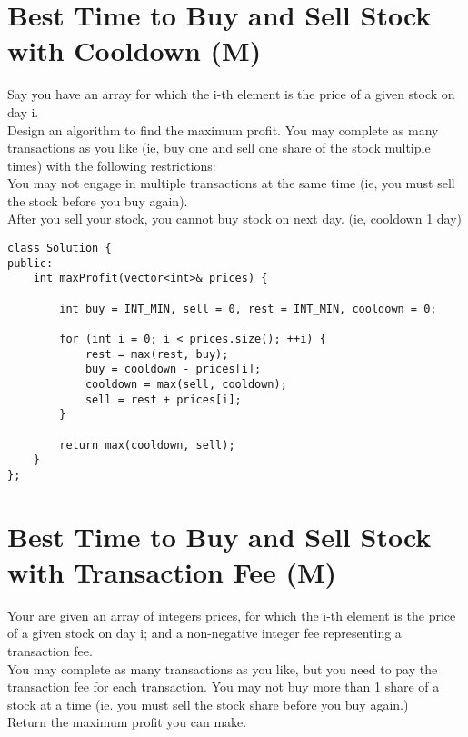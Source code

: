\section{Best Time to Buy and Sell Stock with Cooldown (M)}
Say you have an array for which the i-th element is the price of a given stock on day i.\\

Design an algorithm to find the maximum profit. You may complete as many transactions as you like (ie, buy one and sell one share of the stock multiple times) with the following restrictions:\\

    You may not engage in multiple transactions at the same time (ie, you must sell the stock before you buy again).\\
    After you sell your stock, you cannot buy stock on next day. (ie, cooldown 1 day)\\

\begin{lstlisting}
class Solution {
public:
    int maxProfit(vector<int>& prices) {

        int buy = INT_MIN, sell = 0, rest = INT_MIN, cooldown = 0;
        
        for (int i = 0; i < prices.size(); ++i) {
            rest = max(rest, buy);
            buy = cooldown - prices[i];
            cooldown = max(sell, cooldown);
            sell = rest + prices[i];
        }
        
        return max(cooldown, sell);
    }
};
\end{lstlisting}

\section{Best Time to Buy and Sell Stock with Transaction Fee (M)}
Your are given an array of integers prices, for which the i-th element is the price of a given stock on day i; and a non-negative integer fee representing a transaction fee.\\

You may complete as many transactions as you like, but you need to pay the transaction fee for each transaction. You may not buy more than 1 share of a stock at a time (ie. you must sell the stock share before you buy again.)\\

Return the maximum profit you can make.\\

